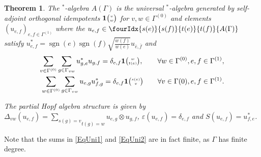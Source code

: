 \documentclass[10pt]{article}
\DeclareMathOperator{\sgn}{\mathrm{sgn}}
\newcommand{\Grt}[3]{#1{\tiny {\begin{pmatrix} #2\\#3\end{pmatrix}}}}
\newcommand{\UnitC}[2]{\Grt{\mathbf{1}}{#1}{#2}}
\newcommand{\Grru}[2]{{\tiny \begin{pmatrix} #1 \\ #2\end{pmatrix}}}
\newcommand{\Gr}[5]{\fourIdx{#2}{#4}{#3}{#5}{#1}}%
\newtheorem{Theorem}{Theorem}[section]
\theoremstyle{definition}
\numberwithin{equation}{section}
\begin{document}
\begin{Theorem}\label{TheoGenRel} The $^*$-algebra $A(\Gamma)$ is the universal $^*$-algebra generated by self-adjoint orthogonal idempotents $\UnitC{v}{w}$ for $v,w\in \Gamma^{(0)}$ and elements $(u_{e,f})_{e,f\in \Gamma^{(1)}}$ where the $u_{e,f}\in \Gr{A(\Gamma)}{s(e)}{t(e)}{s(f)}{t(f)}$ satisfy $u_{e,f}^* = \sgn(e)\sgn(f)\sqrt{\frac{w(f)}{w(e)}} u_{\bar{e},\bar{f}}$ and 
\begin{eqnarray} 
\label{EqUni1}\sum_{v\in \Gamma^{(0)}}\sum_{g\in \Gamma_{vw}} u_{g,e}^*u_{g,f} = \delta_{e,f}\mathbf{1}\Grru{w}{t(e)}, \qquad \forall w\in \Gamma^{(0)}, e,f\in \Gamma^{(1)},\\ %
\label{EqUni2}\sum_{w\in \Gamma^{(0)}} \sum_{g\in \Gamma_{vw}} u_{e,g}u_{f,g}^* = \delta_{e,f} \mathbf{1}\Grru{s(e)}{v}\qquad \forall v\in \Gamma{(0)}, e,f\in \Gamma^{(1)}.
\end{eqnarray}

The partial Hopf algebra structure is given by $\Delta_{vw}(u_{e,f}) = \underset{t(g) = w}{\sum_{s(g) = v}} u_{e,g}\otimes u_{g,f}$, $\varepsilon(u_{e,f}) = \delta_{e,f}$ and $S(u_{e,f}) = u_{f,e}^*$. 
\end{Theorem} 

Note that the sums in \eqref{EqUni1} and \eqref{EqUni2} are in fact finite, as $\Gamma$ has finite degree. 
\end{document}
